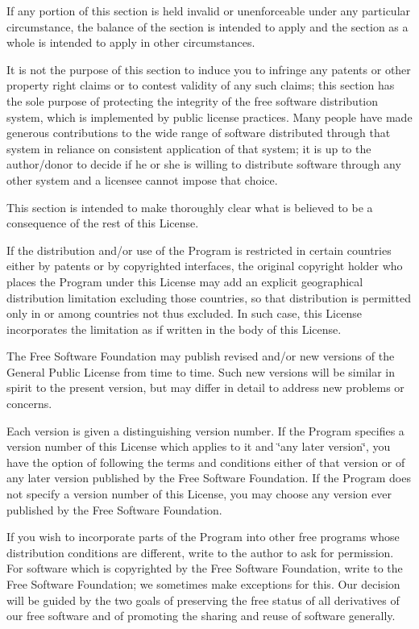 If any portion of this section is held invalid or unenforceable under any particular circumstance, the balance of the section is intended to apply and the section as a whole is intended to apply in other circumstances.

It is not the purpose of this section to induce you to infringe any patents or other property right claims or to contest validity of any such claims; this section has the sole purpose of protecting the integrity of the free software distribution system, which is implemented by public license practices. Many people have made generous contributions to the wide range of software distributed through that system in reliance on consistent application of that system; it is up to the author/donor to decide if he or she is willing to distribute software through any other system and a licensee cannot impose that choice.

This section is intended to make thoroughly clear what is believed to be a consequence of the rest of this License.
\begin{DoxyEnumerate}
\item If the distribution and/or use of the Program is restricted in certain countries either by patents or by copyrighted interfaces, the original copyright holder who places the Program under this License may add an explicit geographical distribution limitation excluding those countries, so that distribution is permitted only in or among countries not thus excluded. In such case, this License incorporates the limitation as if written in the body of this License.
\item The Free Software Foundation may publish revised and/or new versions of the General Public License from time to time. Such new versions will be similar in spirit to the present version, but may differ in detail to address new problems or concerns.
\end{DoxyEnumerate}

Each version is given a distinguishing version number. If the Program specifies a version number of this License which applies to it and \char`\"{}any
later version\char`\"{}, you have the option of following the terms and conditions either of that version or of any later version published by the Free Software Foundation. If the Program does not specify a version number of this License, you may choose any version ever published by the Free Software Foundation.
\begin{DoxyEnumerate}
\item If you wish to incorporate parts of the Program into other free programs whose distribution conditions are different, write to the author to ask for permission. For software which is copyrighted by the Free Software Foundation, write to the Free Software Foundation; we sometimes make exceptions for this. Our decision will be guided by the two goals of preserving the free status of all derivatives of our free software and of promoting the sharing and reuse of software generally.
\end{DoxyEnumerate}

